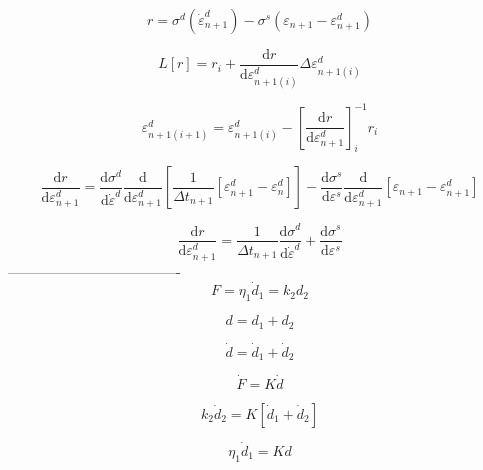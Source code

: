 \documentclass[12pt]{article}
\newcommand{\der}[2]{\dfrac{\text{d} #1}{\text{d} #2}}
\begin{document}
\begin{equation}
		r = \sigma^{d}\left(\dot{\varepsilon}_{n+1}^{d}\right) - \sigma^{s}(\varepsilon_{n+1} - \varepsilon_{n+1}^{d})  
\end{equation}

\begin{equation}
	L[r] = r_{i} + \der{r}{\varepsilon_{n+1(i)}^{d}} \Delta \varepsilon_{n+1(i)}^{d}
\end{equation}

\begin{equation}
	\varepsilon_{n+1(i+1)}^{d} = 	\varepsilon_{n+1(i)}^{d} - \left[\der{r}{\varepsilon_{n+1}^{d}}\right]_{i}^{-1}r_{i}
\end{equation}

\begin{equation}
	\der{r}{\varepsilon_{n+1}^{d}} = \der{\sigma^{d}}{\dot{\varepsilon}^{d}}\der{ }{\varepsilon_{n+1}^{d} }\left[ \dfrac{1}{\Delta t_{n+1}}\left[\varepsilon_{n+1}^{d} - \varepsilon_{n}^{d}\right]\right] - \der{\sigma^{s}}{\varepsilon^{s}}\der{ }{\varepsilon_{n+1}^{d}}\left[\varepsilon_{n+1} - \varepsilon_{n+1}^{d}\right]
\end{equation}


\begin{equation}
	\der{r}{\varepsilon_{n+1}^{d}} = \dfrac{1}{\Delta t_{n+1}}\der{\sigma^{d}}{\dot{\varepsilon}^{d}} + \der{\sigma^{s}}{\varepsilon^{s}}
\end{equation}
-------------------------------------
\begin{equation}
	F = \eta_{1}\dot{d}_{1} = k_{2}d_{2}
\end{equation}

\begin{equation}
	d = d_{1} + d_{2}
\end{equation}

\begin{equation}
\dot{d} = \dot{d}_{1} + \dot{d}_{2}
\end{equation}

\begin{equation}
	\dot{F} = K\dot{d}
\end{equation}

\begin{equation}
k_{2}\dot{d}_{2} = K\left[ \dot{d}_{1} + \dot{d}_{2}\right]
\end{equation}

\begin{equation}
	\eta_{1}\dot{d}_{1} = Kd
\end{equation}
\end{document}
